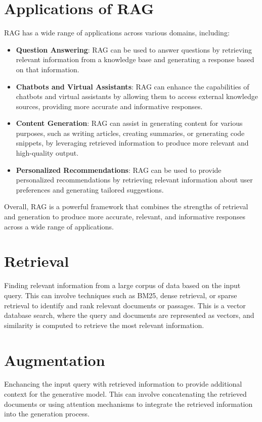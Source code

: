 \documentclass[conference]{IEEEtran}
\begin{document}
\section{Applications of RAG}
RAG has a wide range of applications across various domains, including:
\begin{itemize}
    \item \textbf{Question Answering}: RAG can be used to answer questions by retrieving relevant information from a knowledge base and generating a response based on that information.
    \item \textbf{Chatbots and Virtual Assistants}: RAG can enhance the capabilities of chatbots and virtual assistants by allowing them to access external knowledge sources, providing more accurate and informative responses.
    \item \textbf{Content Generation}: RAG can assist in generating content for various purposes, such as writing articles, creating summaries, or generating code snippets, by leveraging retrieved information to produce more relevant and high-quality output.
    \item \textbf{Personalized Recommendations}: RAG can be used to provide personalized recommendations by retrieving relevant information about user preferences and generating tailored suggestions.
\end{itemize}
Overall, RAG is a powerful framework that combines the strengths of retrieval and generation to produce more accurate, relevant, and informative responses across a wide range of applications.


\section*{Retrieval}
Finding relevant information from a large corpus of data based on the input query. This can involve techniques such as BM25, dense retrieval, or sparse retrieval to identify and rank relevant documents or passages.
This is a vector database search, where the query and documents are represented as vectors, and similarity is computed to retrieve the most relevant information.

\section*{Augmentation}
Enchancing the input query with retrieved information to provide additional context for the generative model. This can involve concatenating the retrieved documents or using attention mechanisms to integrate the retrieved information into the generation process.
\end{document}

